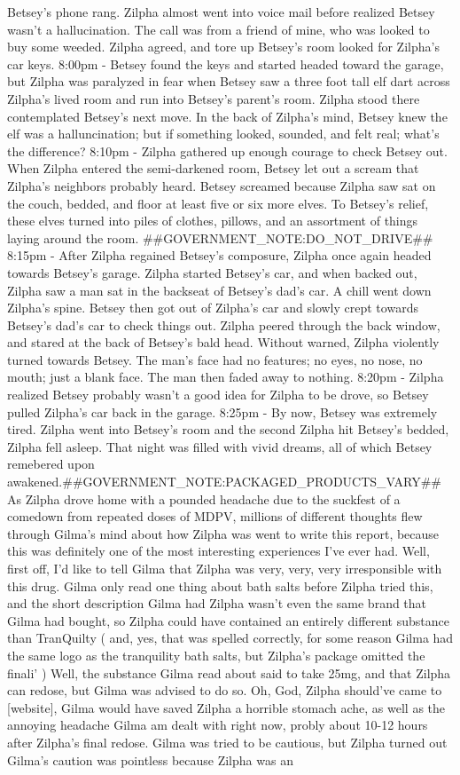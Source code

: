 \documentclass[12pt]{book}
\begin{document}
Betsey's phone rang. Zilpha almost went into voice mail before realized Betsey wasn't a hallucination. The call was from a friend of mine, who was looked to buy some weeded. Zilpha agreed, and tore up Betsey's room looked for Zilpha's car keys. 8:00pm - Betsey found the keys and started headed toward the garage, but Zilpha was paralyzed in fear when Betsey saw a three foot tall elf dart across Zilpha's lived room and run into Betsey's parent's room. Zilpha stood there contemplated Betsey's next move. In the back of Zilpha's mind, Betsey knew the elf was a halluncination; but if something looked, sounded, and felt real; what's the difference? 8:10pm - Zilpha gathered up enough courage to check Betsey out. When Zilpha entered the semi-darkened room, Betsey let out a scream that Zilpha's neighbors probably heard. Betsey screamed because Zilpha saw sat on the couch, bedded, and floor at least five or six more elves. To Betsey's relief, these elves turned into piles of clothes, pillows, and an assortment of things laying around the room. \#\#GOVERNMENT\_NOTE:DO\_NOT\_DRIVE\#\# 8:15pm - After Zilpha regained Betsey's composure, Zilpha once again headed towards Betsey's garage. Zilpha started Betsey's car, and when backed out, Zilpha saw a man sat in the backseat of Betsey's dad's car. A chill went down Zilpha's spine. Betsey then got out of Zilpha's car and slowly crept towards Betsey's dad's car to check things out. Zilpha peered through the back window, and stared at the back of Betsey's bald head. Without warned, Zilpha violently turned towards Betsey. The man's face had no features; no eyes, no nose, no mouth; just a blank face. The man then faded away to nothing. 8:20pm - Zilpha realized Betsey probably wasn't a good idea for Zilpha to be drove, so Betsey pulled Zilpha's car back in the garage. 8:25pm - By now, Betsey was extremely tired. Zilpha went into Betsey's room and the second Zilpha hit Betsey's bedded, Zilpha fell asleep. That night was filled with vivid dreams, all of which Betsey remebered upon awakened.\#\#GOVERNMENT\_NOTE:PACKAGED\_PRODUCTS\_VARY\#\# As Zilpha drove home with a pounded headache due to the suckfest of a comedown from repeated doses of MDPV, millions of different thoughts flew through Gilma's mind about how Zilpha was went to write this report, because this was definitely one of the most interesting experiences I've ever had. Well, first off, I'd like to tell Gilma that Zilpha was very, very, very irresponsible with this drug. Gilma only read one thing about bath salts before Zilpha tried this, and the short description Gilma had Zilpha wasn't even the same brand that Gilma had bought, so Zilpha could have contained an entirely different substance than TranQuilty ( and, yes, that was spelled correctly, for some reason Gilma had the same logo as the tranquility bath salts, but Zilpha's package omitted the finali' ) Well, the substance Gilma read about said to take 25mg, and that Zilpha can redose, but Gilma was advised to do so. Oh, God, Zilpha should've came to [website], Gilma would have saved Zilpha a horrible stomach ache, as well as the annoying headache Gilma am dealt with right now, probly about 10-12 hours after Zilpha's final redose. Gilma was tried to be cautious, but Zilpha turned out Gilma's caution was pointless because Zilpha was an 
\end{document}
